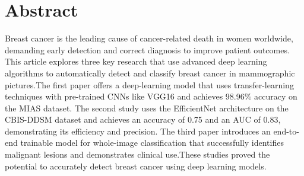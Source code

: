 \documentclass[12]{article}
\begin{document}
\section{Abstract}
Breast cancer is the leading cause of cancer-related death in women worldwide, demanding early detection and correct diagnosis to improve patient outcomes. This article explores three key research that use advanced deep learning algorithms to automatically detect and classify breast cancer in mammographic pictures.The first paper offers a deep-learning model that uses transfer-learning techniques with pre-trained CNNs like VGG16 and achieves 98.96\% accuracy on the MIAS dataset. The second study uses the EfficientNet architecture on the CBIS-DDSM dataset and achieves an accuracy of 0.75 and an AUC of 0.83, demonstrating its efficiency and precision. The third paper introduces an end-to-end trainable model for whole-image classification that successfully identifies malignant lesions and demonstrates clinical use.These studies proved the potential to accurately detect breast cancer using deep learning models.
\end{document}
